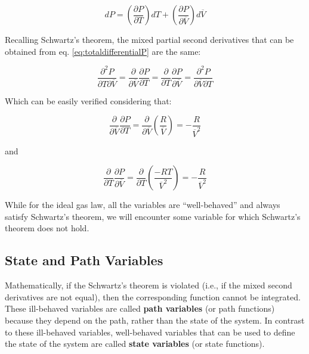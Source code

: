 \documentclass[
  9pt,
]{extbook}
\theoremstyle{definition}
\theoremstyle{definition}
\theoremstyle{definition}
\theoremstyle{remark}
\begin{document}
\begin{equation}
  dP=\left( \frac{\partial P}{\partial T} \right)dT + \left( \frac{\partial P}{\partial \overline{V}} \right)d\overline{V}
  \label{eq:totaldifferentialP}
\end{equation}

Recalling Schwartz's theorem, the mixed partial second derivatives that can be obtained from eq. \eqref{eq:totaldifferentialP} are the same:

\begin{equation}
  \frac{\partial^2 P}{\partial T \partial \overline{V}}=\frac{\partial}{\partial \overline{V}}\frac{\partial P}{\partial T}=\frac{\partial}{\partial T}\frac{\partial P}{\partial \overline{V}}=\frac{\partial^2 P}{\partial \overline{V} \partial T}
  \label{eq:schwartzP}
\end{equation}

Which can be easily verified considering that:

\begin{equation}
  \frac{\partial}{\partial \overline{V}} \frac{\partial P}{\partial T}  = \frac{\partial}{\partial \overline{V}} \left(\frac{R}{\overline{V}}\right) = -\frac{R}{\overline{V}^2} 
  \label{eq:secondderPA}
\end{equation}

and

\begin{equation}
  \frac{\partial}{\partial T} \frac{\partial P}{\partial \overline{V}}  = \frac{\partial}{\partial T} \left(\frac{-RT}{\overline{V}^2}\right) = -\frac{R}{\overline{V}^2} 
  \label{eq:secondderPB}
\end{equation}

While for the ideal gas law, all the variables are ``well-behaved'' and always satisfy Schwartz's theorem, we will encounter some variable for which Schwartz's theorem does not hold.

\hypertarget{state-and-path-variables}{%
\subsection{State and Path Variables}\label{state-and-path-variables}}

Mathematically, if the Schwartz's theorem is violated (i.e., if the mixed second derivatives are not equal), then the corresponding function cannot be integrated. These ill-behaved variables are called \textbf{path variables} (or path functions) because they depend on the path, rather than the state of the system. In contrast to these ill-behaved variables, well-behaved variables that can be used to define the state of the system are called \textbf{state variables} (or state functions).
\end{document}
